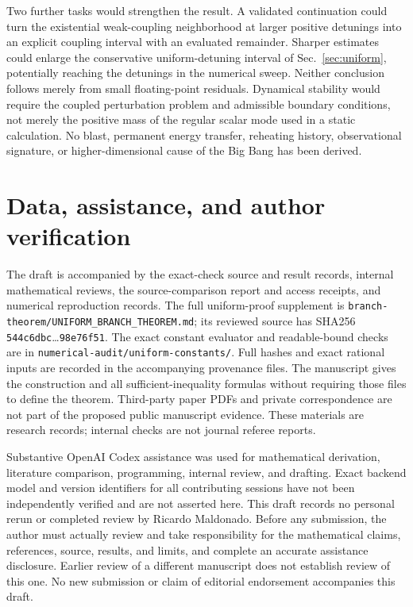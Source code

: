 \documentclass[11pt]{article}
\begin{document}
Two further tasks would strengthen the result. A validated continuation could turn the existential weak-coupling neighborhood at larger positive detunings into an explicit coupling interval with an evaluated remainder. Sharper estimates could enlarge the conservative uniform-detuning interval of Sec.~\ref{sec:uniform}, potentially reaching the detunings in the numerical sweep. Neither conclusion follows merely from small floating-point residuals. Dynamical stability would require the coupled perturbation problem and admissible boundary conditions, not merely the positive mass of the regular scalar mode used in a static calculation. No blast, permanent energy transfer, reheating history, observational signature, or higher-dimensional cause of the Big Bang has been derived.

\section{Data, assistance, and author verification}
The draft is accompanied by the exact-check source and result records, internal mathematical reviews, the source-comparison report and access receipts, and numerical reproduction records. The full uniform-proof supplement is \texttt{branch-theorem/UNIFORM\_BRANCH\_THEOREM.md}; its reviewed source has SHA256 \texttt{544c6dbc}\ldots\texttt{98e76f51}. The exact constant evaluator and readable-bound checks are in \texttt{numerical-audit/uniform-constants/}. Full hashes and exact rational inputs are recorded in the accompanying provenance files. The manuscript gives the construction and all sufficient-inequality formulas without requiring those files to define the theorem. Third-party paper PDFs and private correspondence are not part of the proposed public manuscript evidence. These materials are research records; internal checks are not journal referee reports.

Substantive OpenAI Codex assistance was used for mathematical derivation, literature comparison, programming, internal review, and drafting. Exact backend model and version identifiers for all contributing sessions have not been independently verified and are not asserted here. This draft records no personal rerun or completed review by Ricardo Maldonado. Before any submission, the author must actually review and take responsibility for the mathematical claims, references, source, results, and limits, and complete an accurate assistance disclosure. Earlier review of a different manuscript does not establish review of this one. No new submission or claim of editorial endorsement accompanies this draft.
\end{document}
